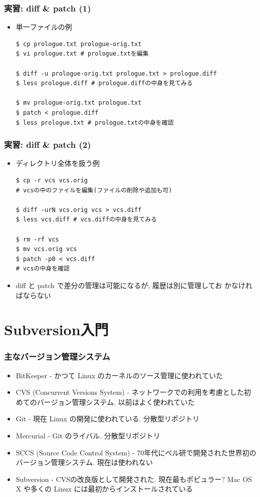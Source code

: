 \documentclass[dvipdfmx]{beamer}
\begin{document}
\begin{frame}[t,fragile]
  \frametitle{実習: diff \& patch (1)}
  \begin{itemize}
  \item 単一ファイルの例
\begin{lstlisting}
$ cp prologue.txt prologue-orig.txt
$ vi prologue.txt # prologue.txtを編集

$ diff -u prologue-orig.txt prologue.txt > prologue.diff
$ less prologue.diff # prologue.diffの中身を見てみる

$ mv prologue-orig.txt prologue.txt
$ patch < prologue.diff
$ less prologue.txt # prologue.txtの中身を確認
\end{lstlisting}
  \end{itemize}
\end{frame}

\begin{frame}[t,fragile]
  \frametitle{実習: diff \& patch (2)}
  \begin{itemize}
  \item ディレクトリ全体を扱う例
\begin{lstlisting}
$ cp -r vcs vcs.orig
# vcsの中のファイルを編集(ファイルの削除や追加も可)

$ diff -urN vcs.orig vcs > vcs.diff
$ less vcs.diff # vcs.diffの中身を見てみる

$ rm -rf vcs
$ mv vcs.orig vcs
$ patch -p0 < vcs.diff
# vcsの中身を確認
\end{lstlisting}
  \item diff と patch で差分の管理は可能になるが, 履歴は別に管理してお
    かなければならない
  \end{itemize}
\end{frame}

\section{Subversion入門}

\begin{frame}
  \frametitle{主なバージョン管理システム}
  \begin{itemize}
  \item BitKeeper - かつて Linux のカーネルのソース管理に使われていた
  \item CVS (Concurrent Versions System) - ネットワークでの利用を考慮とした初めてのバージョン管理システム. 以前はよく使われていた
  \item Git - 現在 Linux の開発に使われている. 分散型リポジトリ
  \item Mercurial - Git のライバル. 分散型リポジトリ
  \item SCCS (Source Code Control System) - 70年代にベル研で開発された世界初のバージョン管理システム. 現在は使われない
  \item {\color{red}Subversion} - CVSの改良版として開発された. 現在最もポピュラー? Mac OS X や多くの Linux には最初からインストールされている
  \end{itemize}
\end{frame}
\end{document}
